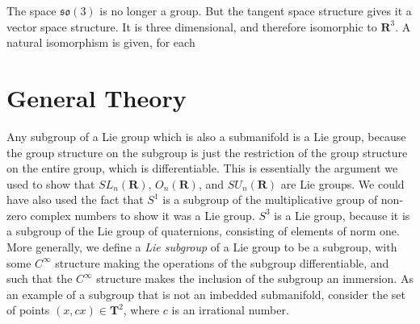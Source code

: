 The space $\mathfrak{so}(3)$ is no longer a group. But the tangent space structure gives it a vector space structure. It is three dimensional, and therefore isomorphic to $\mathbf{R}^3$. A natural isomorphism is given, for each 

\section{General Theory}

Any subgroup of a Lie group which is also a submanifold is a Lie group, because the group structure on the subgroup is just the restriction of the group structure on the entire group, which is differentiable. This is essentially the argument we used to show that $SL_n(\mathbf{R})$, $O_n(\mathbf{R})$, and $SU_n(\mathbf{R})$ are Lie groups. We could have also used the fact that $S^1$ is a subgroup of the multiplicative group of non-zero complex numbers to show it was a Lie group. $S^3$ is a Lie group, because it is a subgroup of the Lie group of quaternions, consisting of elements of norm one. More generally, we define a \emph{Lie subgroup} of a Lie group to be a subgroup, with some $C^\infty$ structure making the operations of the subgroup differentiable, and such that the $C^\infty$ structure makes the inclusion of the subgroup an immersion. As an example of a subgroup that is not an imbedded submanifold, consider the set of points $(x,cx) \in \mathbf{T}^2$, where $c$ is an irrational number.

